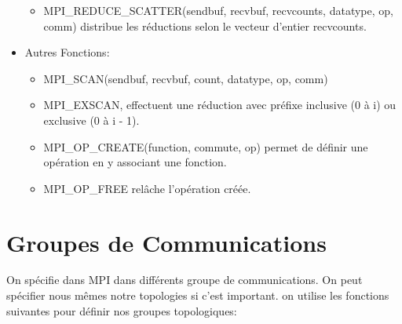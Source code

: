 \documentclass[oneside]{book}
\begin{document}
\begin{itemize}
\begin{itemize}
\item MPI\_REDUCE\_SCATTER(sendbuf, recvbuf, recvcounts,
datatype, op, comm) distribue les réductions selon le
vecteur d'entier recvcounts.
\end{itemize}

\item Autres Fonctions:\\
\begin{itemize}
\item MPI\_SCAN(sendbuf, recvbuf, count, datatype, op, comm)
\item MPI\_EXSCAN, effectuent une réduction avec préfixe
inclusive (0 à i) ou exclusive (0 à i - 1).
\item MPI\_OP\_CREATE(function, commute, op) permet de
définir une opération en y associant une fonction.
\item MPI\_OP\_FREE relâche l'opération créée.
\end{itemize}
\end{itemize}

\section{Groupes de Communications}
On spécifie dans MPI dans différents groupe de communications. On peut spécifier nous mêmes notre topologies si c'est important. on utilise les fonctions suivantes pour définir nos groupes topologiques:\\
\end{document}
